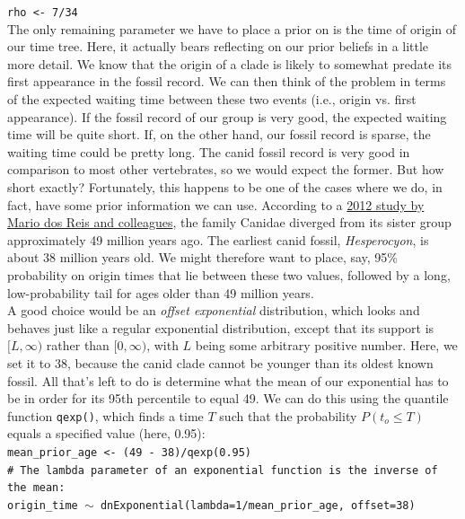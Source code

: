 \documentclass[12pt]{article}
\begin{document}
\indent \texttt{rho <- 7/34} \\

\noindent The only remaining parameter we have to place a prior on is the time of origin of our time tree. Here, it actually bears reflecting on our prior beliefs in a little more detail. We know that the origin of a clade is likely to somewhat predate its first appearance in the fossil record. We can then think of the problem in terms of the expected waiting time between these two events (i.e., origin vs. first appearance). If the fossil record of our group is very good, the expected waiting time will be quite short. If, on the other hand, our fossil record is sparse, the waiting time could be pretty long. The canid fossil record is very good in comparison to most other vertebrates, so we would expect the former. But how short exactly? Fortunately, this happens to be one of the cases where we do, in fact, have some prior information we can use. According to a \href{https://royalsocietypublishing.org/doi/epdf/10.1098/rspb.2012.0683}{2012 study by Mario dos Reis and colleagues}, the family Canidae diverged from its sister group approximately 49 million years ago. The earliest canid fossil, \textit{Hesperocyon}, is about 38 million years old. We might therefore want to place, say, 95\% probability on origin times that lie between these two values, followed by a long, low-probability tail for ages older than 49 million years. \\

\noindent A good choice would be an \textit{offset exponential} distribution, which looks and behaves just like a regular exponential distribution, except that its support is $[L, \infty)$ rather than $[0, \infty)$, with $L$ being some arbitrary positive number. Here, we set it to 38, because the canid clade cannot be younger than its oldest known fossil. All that's left to do is determine what the mean of our exponential has to be in order for its 95th percentile to equal 49. We can do this using the quantile function \texttt{qexp()}, which finds a time $T$ such that the probability $P(t_o \leq T)$ equals a specified value (here, 0.95): \\

\indent \texttt{mean\_prior\_age <- (49 - 38)/qexp(0.95)} \\
\indent \texttt{\# The lambda parameter of an exponential function is the inverse of the mean:} \\
\indent \texttt{origin\_time {\footnotesize $\sim$} dnExponential(lambda=1/mean\_prior\_age, offset=38)} \\
\end{document}
